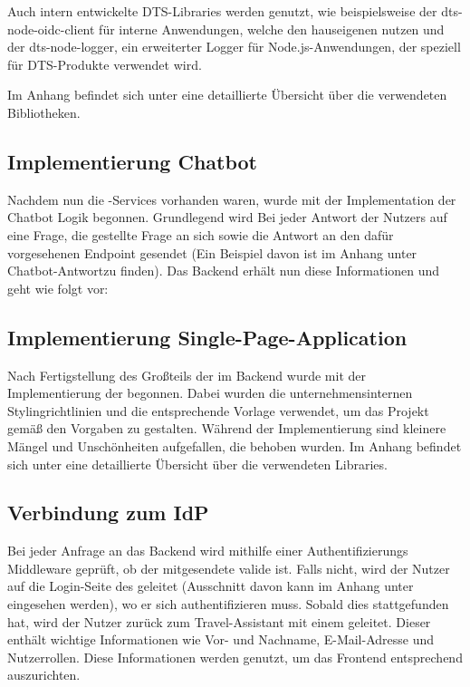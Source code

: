 Auch intern entwickelte DTS-Libraries werden genutzt, wie beispielsweise der dts-node-oidc-client für interne Anwendungen, welche den hauseigenen  nutzen und der dts-node-logger, ein erweiterter Logger für Node.js-Anwendungen, der speziell für DTS-Produkte verwendet wird.

Im Anhang befindet sich unter  eine detaillierte Übersicht über die verwendeten Bibliotheken.

\subsection{Implementierung Chatbot}
Nachdem nun die -Services vorhanden waren, wurde mit der Implementation der Chatbot Logik begonnen. Grundlegend wird Bei jeder Antwort der Nutzers auf eine Frage, die gestellte Frage an sich sowie die Antwort an den dafür vorgesehenen Endpoint gesendet (Ein Beispiel davon ist im Anhang unter Chatbot-Antwort\todo zu finden). Das Backend erhält nun diese Informationen und geht wie folgt vor:


\subsection{Implementierung Single-Page-Application}

Nach Fertigstellung des Großteils der  im Backend wurde mit der Implementierung der  begonnen. Dabei wurden die unternehmensinternen Stylingrichtlinien und die entsprechende Vorlage verwendet, um das Projekt gemäß den Vorgaben zu gestalten. Während der Implementierung sind kleinere Mängel und Unschönheiten aufgefallen, die behoben wurden. Im Anhang befindet sich unter  eine detaillierte Übersicht über die verwendeten Libraries.

\subsection{Verbindung zum IdP}

Bei jeder Anfrage an das Backend wird mithilfe einer Authentifizierungs Middleware geprüft, ob der mitgesendete  valide ist. Falls nicht, wird der Nutzer auf die Login-Seite des  geleitet (Ausschnitt davon kann im Anhang unter  eingesehen werden), wo er sich authentifizieren muss. Sobald dies stattgefunden hat, wird der Nutzer zurück zum Travel-Assistant mit einem  geleitet. Dieser  enthält wichtige Informationen wie Vor- und Nachname, E-Mail-Adresse und Nutzerrollen. Diese Informationen werden genutzt, um das Frontend entsprechend auszurichten.

